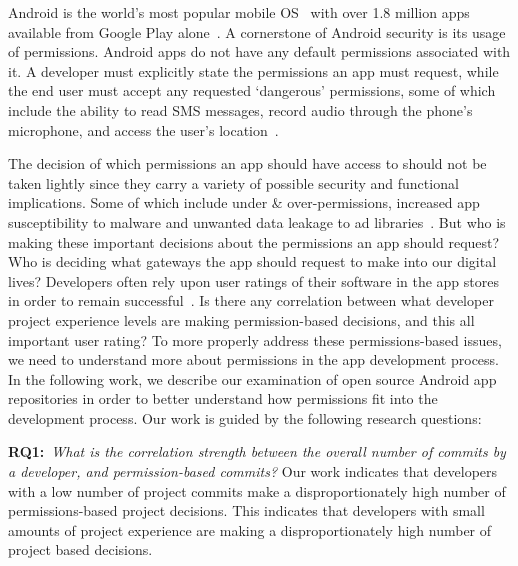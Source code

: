 \documentclass{sig-alternate-05-2015}
\begin{document}
Android is the world's most popular mobile OS~\cite{OSMarketShare_URL} with over 1.8 million apps available from Google Play alone~\cite{statistica_url}. A cornerstone of Android security is its usage of permissions. Android apps do not have any default permissions associated with it. A developer must explicitly state the permissions an app must request, while the end user must accept any requested `dangerous' permissions, some of which include the ability to read SMS messages, record audio through the phone's microphone, and access the user's location~\cite{AndroidSystemPermissions_URL}.

The decision of which permissions an app should have access to should not be taken lightly since they carry a variety of possible security and functional implications. Some of which include under \& over-permissions, increased app susceptibility to malware and unwanted data leakage to ad libraries~\cite{Felt:2011:APD:2046707.2046779, Grace:2012:UEA:2185448.2185464}. But who is making these important decisions about the permissions an app should request? Who is deciding what gateways the app should request to make into our digital lives? Developers often rely upon user ratings of their software in the app stores in order to remain successful~\cite{Khalid_Mei_Examinging, al2015app}. Is there any correlation between what developer project experience levels are making permission-based decisions, and this all important user rating? To more properly address these permissions-based issues, we need to understand more about permissions in the app development process. In the following work, we describe our examination of  open source Android app repositories in order to better understand how permissions fit into the development process. Our work is guided by the following research questions:




\noindent
\textbf{RQ1:}~\emph{What is the correlation strength between the overall number of commits by a developer, and permission-based commits?} Our work indicates that developers with a low number of project commits make a disproportionately high number of permissions-based project decisions. This indicates that developers with small amounts of project experience are making a disproportionately high number of project based decisions.

\end{document}
